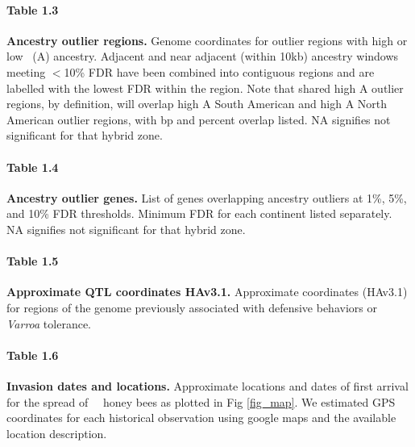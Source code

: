\paragraph*{Table 1.3}
\label{table_outliers}
{\bf Ancestry outlier regions.} Genome coordinates for outlier regions with high or low \scutellata\ (A) ancestry. Adjacent and near adjacent (within 10kb) ancestry windows meeting $<$10\% FDR have been combined into contiguous regions and are labelled with the lowest FDR within the region. Note that shared high A outlier regions, by definition, will overlap high A South American and high A North American outlier regions, with bp and percent overlap listed. NA signifies not significant for that hybrid zone.

\paragraph*{Table 1.4}
\label{table_genes}
{\bf Ancestry outlier genes.} List of genes overlapping ancestry outliers at 1\%, 5\%, and 10\% FDR thresholds. Minimum FDR for each continent listed separately. NA signifies not significant for that hybrid zone.

\paragraph*{Table 1.5}
\label{table_qtl}
{\bf Approximate QTL coordinates HAv3.1.} Approximate coordinates (HAv3.1) for regions of the genome previously associated with defensive behaviors or \textit{Varroa} tolerance.

\paragraph*{Table 1.6}
\label{table_hx_dates}
{\bf Invasion dates and locations.} Approximate locations and dates of first arrival for the spread of \africanized\ \hyb\ honey bees as plotted in Fig \ref{fig_map}. We estimated GPS coordinates for each historical observation using google maps and the available location description.
\newline


